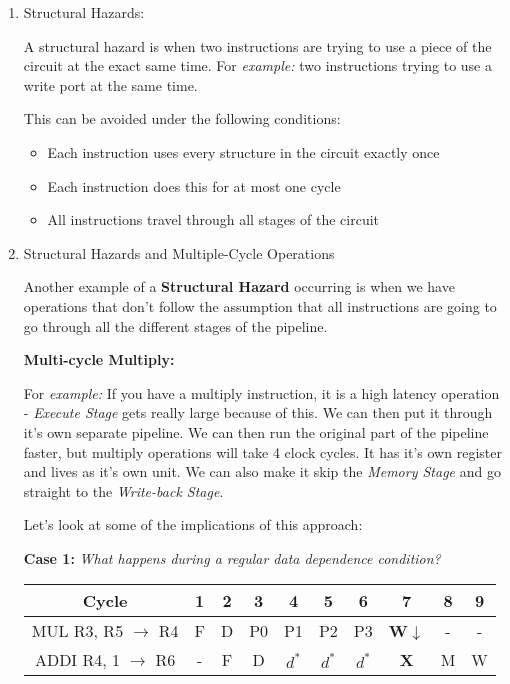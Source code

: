 \documentclass[12pt]{article}
\newenvironment{QandA}{\begin{enumerate}[label=\bfseries\arabic*.]\bfseries}
                      {\end{enumerate}}
\newenvironment{answered}{\par\quad\normalfont}{}
\begin{document}
\begin{QandA}
    \item Structural Hazards:
    \begin{answered}
        A structural hazard is when two instructions are trying to use a piece of the circuit at the exact same time. For \textit{example:} two instructions trying to use a write port at the same time. 
        
        This can be avoided under the following conditions:
        \begin{itemize}
            \item Each instruction uses every structure in the circuit exactly once
            \item Each instruction does this for at most one cycle
            \item All instructions travel through all stages of the circuit
        \end{itemize}
    \end{answered}
    
    \item Structural Hazards and Multiple-Cycle Operations
    \begin{answered}
    Another example of a \textbf{Structural Hazard} occurring is when we have operations that don't follow the assumption that all instructions are going to go through all the different stages of the pipeline. 
    
    \textbf{Multi-cycle Multiply:}
    
    For \textit{example:} If you have a multiply instruction, it is a high latency operation - \textit{Execute Stage} gets really large because of this. We can then put it through it's own separate pipeline. We can then run the original part of the pipeline faster, but multiply operations will take 4 clock cycles. It has it's own register and lives as it's own unit. We can also make it skip the \textit{Memory Stage} and go straight to the \textit{Write-back Stage}.
    
    Let's look at some of the implications of this approach:
    
    \textbf{Case 1:} \textit{What happens during a regular data dependence condition?}
    
    \begin{center}
    \begin{tabular}{ |c|c|c|c|c|c|c|c|c|c| } 
     \hline
     Cycle & 1 & 2 & 3 & 4 & 5 & 6 & 7 & 8 & 9\\ 
     \hline
     MUL R3, R5 $\rightarrow$ R4 & F & D & P0 & P1 & P2 & P3 & \textbf{W}$\downarrow$ & - & -\\ 
     ADDI R4, 1 $\rightarrow$ R6 & - & F & D & $d^{*}$ & $d^{*}$ & $d^{*}$ & \textbf{X } & M & W \\ 
     \hline
    \end{tabular}
    \end{center} 
    

\end{answered}
\end{QandA}
\end{document}
